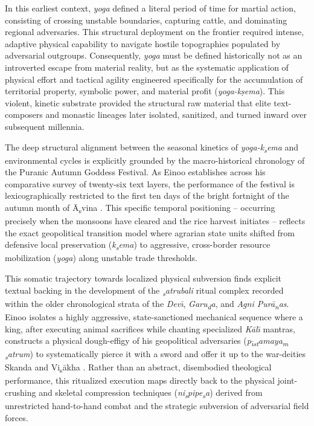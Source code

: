 \documentclass[11pt,twoside,letterpaper]{article}
\begin{document}
In this earliest context, \textit{yoga} defined a literal period of time for martial action, consisting of crossing unstable boundaries, capturing cattle, and dominating regional adversaries. This structural deployment on the frontier required intense, adaptive physical capability to navigate hostile topographies populated by adversarial outgroups. Consequently, \textit{yoga} must be defined historically not as an introverted escape from material reality, but as the systematic application of physical effort and tactical agility engineered specifically for the accumulation of territorial property, symbolic power, and material profit (\textit{yoga-kṣema}). This violent, kinetic substrate provided the structural raw material that elite text-composers and monastic lineages later isolated, sanitized, and turned inward over subsequent millennia.

The deep structural alignment between the seasonal kinetics of \textit{yoga-k\textsubscript{s}ema} and environmental cycles is explicitly grounded by the macro-historical chronology of the Puranic Autumn Goddess Festival. As Einoo establishes across his comparative survey of twenty-six text layers, the performance of the festival is lexicographically restricted to the first ten days of the bright fortnight of the autumn month of \={A}\textsubscript{s}vina \cite{Einoo1999}. This specific temporal positioning -- occurring precisely when the monsoons have cleared and the rice harvest initiates -- reflects the exact geopolitical transition model where agrarian state units shifted from defensive local preservation (\textit{k\textsubscript{s}ema}) to aggressive, cross-border resource mobilization (\textit{yoga}) along unstable trade thresholds.

This somatic trajectory towards localized physical subversion finds explicit textual backing in the development of the \textit{\textsubscript{s}atrubali} ritual complex recorded within the older chronological strata of the \textit{Dev\={\i}}, \textit{Garu\textsubscript{d}a}, and \textit{Agni Pur\={a}\textsubscript{n}as}. Einoo isolates a highly aggressive, state-sanctioned mechanical sequence where a king, after executing animal sacrifices while chanting specialized \textit{K\={a}l\={\i}} mantras, constructs a physical dough-effigy of his geopolitical adversaries (\textit{p\textsubscript{\={\i}}\textsubscript{s}\textsubscript{t}amaya\textsubscript{m} \textsubscript{s}atrum}) to systematically pierce it with a sword and offer it up to the war-deities Skanda and Vi\textsubscript{s}\={a}kha \cite{Einoo1999}. Rather than an abstract, disembodied theological performance, this ritualized execution maps directly back to the physical joint-crushing and skeletal compression techniques (\textit{ni\textsubscript{s}pipe\textsubscript{s}a}) derived from unrestricted hand-to-hand combat and the strategic subversion of adversarial field forces.
\end{document}

